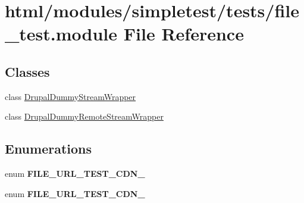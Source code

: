 \hypertarget{file__test_8module}{
\section{html/modules/simpletest/tests/file\_\-test.module File Reference}
\label{file__test_8module}
}
\subsection*{Classes}
\begin{DoxyCompactItemize}
\item 
class \hyperlink{classDrupalDummyStreamWrapper}{DrupalDummyStreamWrapper}
\item 
class \hyperlink{classDrupalDummyRemoteStreamWrapper}{DrupalDummyRemoteStreamWrapper}
\end{DoxyCompactItemize}
\subsection*{Enumerations}
\begin{DoxyCompactItemize}
\item 
enum {\bfseries FILE\_\-URL\_\-TEST\_\-CDN\_} 
\item 
enum {\bfseries FILE\_\-URL\_\-TEST\_\-CDN\_} 
\end{DoxyCompactItemize}
